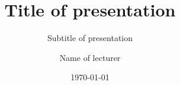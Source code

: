 \title{Title of presentation}
\subtitle{Subtitle of presentation}
\author{Name of lecturer}
\date{\today}